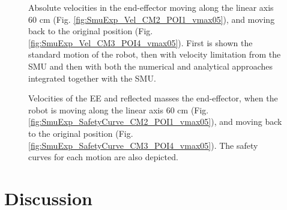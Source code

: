 \begin{figure}[htp!]
	\centering	
	 	 	
		\caption{Absolute velocities in the end-effector moving along the linear axis 60 cm (Fig. \ref{fig:SmuExp_Vel_CM2_POI1_vmax05}), and moving back to the original position (Fig. \ref{fig:SmuExp_Vel_CM3_POI4_vmax05}). First is shown the standard motion of the robot, then with velocity limitation from the SMU and then with both the numerical and analytical approaches integrated together with the SMU.}
	\label{fig:SmuExp_Vel_vmax05}
\end{figure}




\begin{figure}[htp!]
	\centering	
	 	 	
	\caption{Velocities of the EE and reflected masses the end-effector, when the robot is moving along the linear axis 60 cm (Fig.\ref{fig:SmuExp_SafetyCurve_CM2_POI1_vmax05}), and moving back to the original position (Fig.\ref{fig:SmuExp_SafetyCurve_CM3_POI4_vmax05}). The safety curves for each motion are also depicted.}  
	\label{fig:SmuExp_SafetyCurve_vmax05}
\end{figure}


\section{Discussion}



